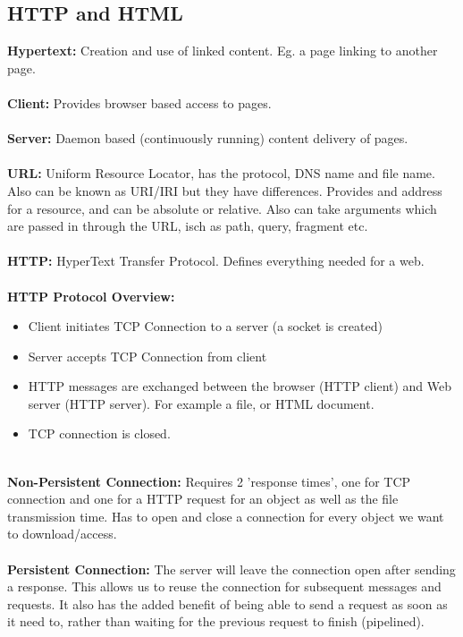 \documentclass[a4paper,10pt]{article}
\begin{document}
\subsection{HTTP and HTML}
\textcolor{JungleGreen}{\textbf{Hypertext:}} Creation and use of linked content. Eg. a page linking to another page. \\\\
\textcolor{JungleGreen}{\textbf{Client:}} Provides browser based access to pages. \\\\
\textcolor{JungleGreen}{\textbf{Server:}} Daemon based (continuously running) content delivery of pages. \\\\
\textcolor{JungleGreen}{\textbf{URL:}} Uniform Resource Locator, has the protocol, DNS name and file name. Also can be known as URI/IRI but they have differences. Provides and address for a resource, and can be absolute or relative. Also can take arguments which are passed in through the URL, isch as path, query, fragment etc.\\\\
\textcolor{JungleGreen}{\textbf{HTTP:}} HyperText Transfer Protocol. Defines everything needed for a web. \\\\
\textcolor{JungleGreen}{\textbf{HTTP Protocol Overview:}} 
\begin{itemize}
	\item Client initiates TCP Connection to a server (a socket is created)
	\item Server accepts TCP Connection from client 
	\item HTTP messages are exchanged between the browser (HTTP client) and Web server (HTTP server). For example a file, or HTML document. 
	\item TCP connection is closed. \\\\
\end{itemize}
\textcolor{JungleGreen}{\textbf{Non-Persistent Connection:}} Requires 2 'response times', one for TCP connection and one for a HTTP request for an object as well as the file transmission time. Has to open and close a connection for every object we want to download/access. \\\\
\textcolor{JungleGreen}{\textbf{Persistent Connection:}} The server will leave the connection open after sending a response. This allows us to reuse the connection for subsequent messages and requests. It also has the added benefit of being able to send a request as soon as it need to, rather than waiting for the previous request to finish (pipelined). \\\\
\end{document}
